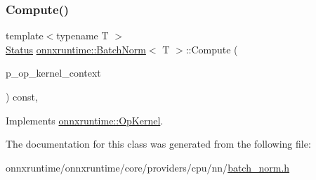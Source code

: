 \mbox{\label{classonnxruntime_1_1BatchNorm_ab13471fc99135059f07247a3bfcff208}} 
\subsubsection{\texorpdfstring{Compute()}{Compute()}\hspace{0.1cm}{\footnotesize\ttfamily [2/2]}}
{\footnotesize\ttfamily template$<$typename T $>$ \\
\mbox{\hyperlink{classonnxruntime_1_1common_1_1Status}{Status}} \mbox{\hyperlink{classonnxruntime_1_1BatchNorm}{onnxruntime\+::\+Batch\+Norm}}$<$ T $>$\+::Compute (\begin{DoxyParamCaption}\item[{\mbox{\hyperlink{classonnxruntime_1_1OpKernelContext}{Op\+Kernel\+Context}} $\ast$}]{p\+\_\+op\+\_\+kernel\+\_\+context }\end{DoxyParamCaption}) const\hspace{0.3cm}{\ttfamily [override]}, {\ttfamily [virtual]}}



Implements \mbox{\hyperlink{classonnxruntime_1_1OpKernel_a9eca8656a78b1b3ab9d3351a12798650}{onnxruntime\+::\+Op\+Kernel}}.



The documentation for this class was generated from the following file\+:\begin{DoxyCompactItemize}
\item 
onnxruntime/onnxruntime/core/providers/cpu/nn/\mbox{\hyperlink{cpu_2nn_2batch__norm_8h}{batch\+\_\+norm.\+h}}\end{DoxyCompactItemize}

